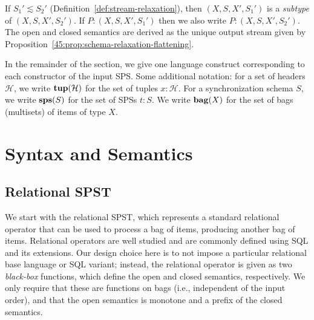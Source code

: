 \begin{definition}
\label{45:def:spst-subtyping}
If $S_1' \lesssim S_2'$ (Definition~\ref{def:stream-relaxation}),
then $(X, S, X', S_1')$ is a \emph{subtype} of $(X, S, X', S_2')$.
If $P: (X, S, X', S_1')$
then we also write $P: (X, S, X', S_2')$.
The open and closed semantics are derived as the unique output stream
given by Proposition~\ref{45:prop:schema-relaxation-flattening}.
\end{definition}

\noindent
In the remainder of the section,
we give one language construct corresponding to each constructor of the input SPS.
Some additional notation:
for a set of headers $\mathcal{H}$,
we write $\mathbf{tup}(\mathcal{H})$ for the set of tuples $x: \mathcal{H}$.
For a synchronization schema $S$,
we write $\mathbf{sps}(S)$ for the set of SPSs $t: S$.
We write $\mathbf{bag}(X)$ for the set of bags (multisets) of items of type $X$.


\section{Syntax and Semantics}

\subsection{Relational SPST}

We start with the relational SPST, which represents a standard relational operator that can be used to process a bag of items, producing another bag of items.
Relational operators are well studied and are commonly defined using SQL
and its extensions.
Our design choice here is to not impose a particular relational base language
or SQL variant;
instead,
the relational operator is given as two \emph{black-box} functions,
which define the open and closed semantics,
respectively.
We only require that these are functions on bags (i.e., independent of the input order),
and that the open semantics is monotone and a prefix
of the closed semantics.

